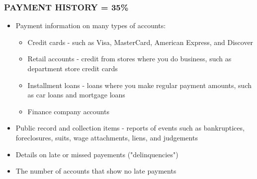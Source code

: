 \documentclass[12pt]{article}
\begin{document}
            \subsubsection{PAYMENT HISTORY = 35\%}
                \begin{itemize}
                    \item Payment information on many types of accounts:
                        \begin{itemize}
                            \item Credit cards - such as Visa, MasterCard, American Express, and Discover
                            \item Retail accounts - credit from stores where you do business, such as department store credit cards
                            \item Installment loans - loans where you make regular payment amounts, such as car loans and mortgage loans
                            \item Finance company accounts
                        \end{itemize}
                    \item Public record and collection items - reports of events such as bankruptices, foreclosures, suits, wage attachments,
                        liens, and judgements
                    \item Details on late or missed payements ("delinquencies")
                    \item The number of accounts that show no late payments
                \end{itemize}
\end{document}
